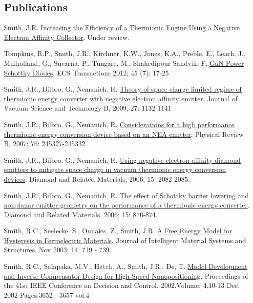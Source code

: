 \documentclass[letterpaper,margin,line]{res}
\begin{document}
\begin{resume}
\section{\sc Publications}

Smith, J.R. \href{http://arxiv.org/abs/1304.3060}{Increasing the Efficiency of a Thermionic Engine Using a Negative Electron Affinity Collector}. Under review.

Tompkins, R.P., Smith, J.R., Kirchner, K.W., Jones, K.A., Preble, E., Leach, J., Mulholland, G., Suvarna, P., Tungare, M., Shahedipour-Sandvik, F. \href{10.1149/1.3701521}{GaN Power Schottky Diodes}. ECS Transactions 2012; 45 (7): 17-25

Smith, J.R., Bilbro, G., Nemanich, R. \href{http://dx.doi.org/10.1116/1.3125282}{Theory of space charge limited regime of thermionic energy converter with negative electron affinity emitter}. Journal of Vacuum Science and Technology B, 2009; 27: 1132-1141

Smith, J.R., Bilbro, G., Nemanich, R. \href{http://dx.doi.org/10.1103/PhysRevB.76.245327}{Considerations for a high performance thermionic energy conversion device based on an NEA emitter}. Physical Review B, 2007; 76: 245327-245332

Smith, J.R., Bilbro, G., Nemanich, R. \href{http://dx.doi.org/10.1016/j.diamond.2006.09.011}{Using negative electron affinity diamond emitters to mitigate space charge in vacuum thermionic energy conversion devices}. Diamond and Related Materials, 2006; 15: 2082-2085.

Smith, J.R., Bilbro, G., Nemanich, R. \href{http://dx.doi.org/10.1016/j.diamond.2005.12.057}{The effect of Schottky barrier lowering and nonplanar emitter geometry on the performance of a thermionic energy converter}. Diamond and Related Materials, 2006; 15: 870-874.

Smith, R.C., Seelecke, S., Ounaies, Z., Smith, J.R. \href{http://dx.doi.org/10.1177/1045389X03038841}{A Free Energy Model for Hysteresis in Ferroelectric Materials}. Journal of Intelligent Material Systems and Structures, Nov 2003;  14:  719 - 739.

Smith, R.C., Salapaka, M.V., Hatch, A., Smith, J.R., De, T. \href{http://dx.doi.org/10.1109/CDC.2002.1184930}{Model Development and Inverse Compensator Design for High Speed Nanopositioning}. Proceedings of the 41st IEEE Conference on Decision and Control, 2002.Volume: 4,10-13 Dec. 2002 Pages:3652  - 3657 vol.4



\end{resume}
\end{document}
